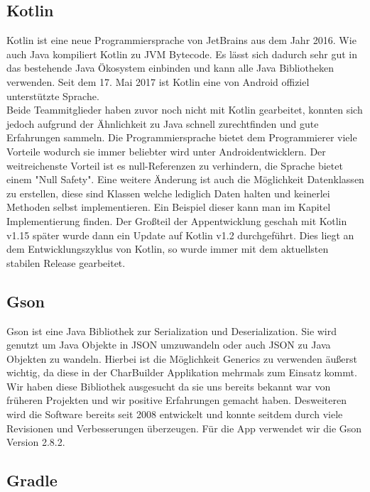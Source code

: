 \subsection{Kotlin}

Kotlin ist eine neue Programmiersprache von JetBrains aus dem Jahr 2016. Wie auch Java kompiliert Kotlin zu JVM Bytecode. Es lässt sich dadurch sehr gut in das bestehende Java Ökosystem einbinden und kann alle Java Bibliotheken verwenden. Seit dem 17. Mai 2017 ist Kotlin eine von Android offiziel unterstützte Sprache.\\
Beide Teammitglieder haben zuvor noch nicht mit Kotlin gearbeitet, konnten sich jedoch aufgrund der Ähnlichkeit zu Java schnell zurechtfinden und gute Erfahrungen sammeln. Die Programmiersprache bietet dem Programmierer viele Vorteile wodurch sie immer beliebter wird unter Androidentwicklern. Der weitreichenste Vorteil ist es  null-Referenzen zu verhindern, die Sprache bietet einem "Null Safety". Eine weitere Änderung ist auch die Möglichkeit Datenklassen zu erstellen, diese sind Klassen welche lediglich Daten halten und keinerlei Methoden selbst implementieren. Ein Beispiel dieser kann man im Kapitel Implementierung finden. Der Großteil der Appentwicklung geschah mit Kotlin v1.15 später wurde dann ein Update auf Kotlin v1.2 durchgeführt. Dies liegt an dem Entwicklungszyklus von Kotlin, so wurde immer mit dem aktuellsten stabilen Release gearbeitet.

\subsection{Gson}

Gson ist eine Java Bibliothek zur Serialization und Deserialization. Sie wird genutzt um Java Objekte in JSON umzuwandeln oder auch JSON zu Java Objekten zu wandeln. Hierbei ist die Möglichkeit Generics zu verwenden äußerst wichtig, da diese in der CharBuilder Applikation mehrmals zum Einsatz kommt. Wir haben diese Bibliothek ausgesucht da sie uns bereits bekannt war von früheren Projekten und wir positive Erfahrungen gemacht haben. Desweiteren wird die Software bereits seit 2008 entwickelt und konnte seitdem durch viele Revisionen und Verbesserungen überzeugen. Für die App verwendet wir die Gson Version 2.8.2.

\subsection{Gradle}

